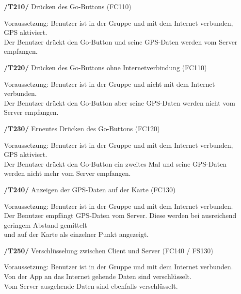 \begin{itemize}
\begin{itemize}
\begin{itemize}
\begin{itemize}
\textbf{/T210/} Drücken des Go-Buttons (FC110)\\
\begin{itemize}
Voraussetzung: Benutzer ist in der Gruppe und mit dem Internet verbunden, GPS aktiviert.\\
Der Benutzer drückt den Go-Button und seine GPS-Daten werden vom Server empfangen.       \\
\end{itemize}

\textbf{/T220/} Drücken des Go-Buttons ohne Internetverbindung (FC110)\\
\begin{itemize}
Voraussetzung: Benutzer ist in der Gruppe und nicht mit dem Internet verbunden.           \\
Der Benutzer drückt den Go-Button aber seine GPS-Daten werden nicht vom Server empfangen.  \\
\end{itemize}

\textbf{/T230/} Erneutes Drücken des Go-Buttons (FC120)\\
\begin{itemize}
Voraussetzung: Benutzer ist in der Gruppe und mit dem Internet verbunden, GPS aktiviert.    \\
Der Benutzer drückt den Go-Button ein zweites Mal und seine GPS-Daten werden nicht mehr vom Server empfangen.\\
\end{itemize}

\textbf{/T240/} Anzeigen der GPS-Daten auf der Karte (FC130)\\
\begin{itemize}
Voraussetzung: Benutzer ist in der Gruppe und mit dem Internet verbunden.                                     \\
Der Benutzer empfängt GPS-Daten vom Server. Diese werden bei ausreichend geringem Abstand gemittelt            \\
und auf der Karte als einzelner Punkt angezeigt.                                                                \\
\end{itemize}

\textbf{/T250/} Verschlüsselung zwischen Client und Server (FC140 / FS130)\\
\begin{itemize}
Voraussetzung: Benutzer ist in der Gruppe und mit dem Internet verbunden.            \\
Von der App an das Internet gehende Daten sind verschlüsselt.                         \\
Vom Server ausgehende Daten sind ebenfalls verschlüsselt.                              \\
\end{itemize}


\end{itemize}
\end{itemize}
\end{itemize}
\end{itemize}
